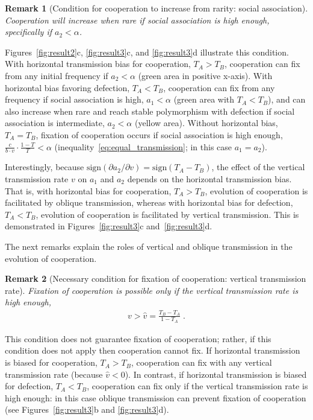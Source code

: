 \documentclass[12pt]{extarticle}
\newtheorem{remark}{Remark}
\begin{document}
\begin{remark}[Condition for cooperation to increase from rarity: social association]
\label{remark:intermediate_association_res3}
Cooperation will increase when rare if social association is high enough, specifically if $a_2 < \alpha$.
\end{remark}
Figures~\ref{fig:result2}c, \ref{fig:result3}c, and \ref{fig:result3}d illustrate this condition.
With horizontal transmission bias for cooperation, $T_A>T_B$, cooperation can fix from any initial frequency if $a_2<\alpha$ (green area in positive x-axis). 
With horizontal bias favoring defection, $T_A<T_B$, cooperation can fix from any frequency if social association is high, $a_1<\alpha$ (green area with $T_A<T_B$), and can also increase when rare and reach stable polymorphism with defection if social association is intermediate, $a_2<\alpha$ (yellow area).
Without horizontal bias, $T_A=T_B$, fixation of cooperation occurs if social association is high enough, $\frac{c}{b \cdot v} \cdot \frac{1-T}{T} < \alpha$ (inequality~\ref{eq:equal_transmission}; in this case $a_1=a_2$).

Interestingly, because $\text{sign} (\partial a_2 / \partial v) = \text{sign} (T_A-T_B)$, the effect of the vertical transmission rate $v$ on $a_1$ and $a_2$ depends on the horizontal transmission bias. 
That is, with horizontal bias for cooperation, $T_A>T_B$, evolution of cooperation is facilitated by oblique transmission, whereas with horizontal bias for defection, $T_A<T_B$, evolution of cooperation is facilitated by vertical transmission.
This is demonstrated in Figures~\ref{fig:result3}c and~\ref{fig:result3}d.

The next remarks explain the roles of vertical and oblique transmission in the evolution of cooperation.
\\

\begin{remark}[Necessary condition for fixation of cooperation: vertical transmission rate]
\label{remark:vhat}
  Fixation of cooperation is possible only if the vertical transmission rate is high enough,
  \begin{equation} \label{eq:fixation_of_cooperation_vertical_transmission_condition}
    \begin{aligned}
      v>\hat{v} = \frac{T_B - T_A}{1-T_A} \;.
    \end{aligned}
    \end{equation} 
\end{remark}
This condition does not guarantee fixation of cooperation; rather, if this condition does not apply then cooperation cannot fix.
If horizontal transmission is biased for cooperation, $T_A>T_B$, cooperation can fix with any vertical transmission rate (because $\hat{v}<0$).
In contrast, if horizontal transmission is biased for defection, $T_A<T_B$,  cooperation can fix only if the vertical transmission rate is high enough: in this case oblique transmission can prevent fixation of cooperation (see Figures~\ref{fig:result3}b and \autoref{fig:result3}d).
\end{document}
